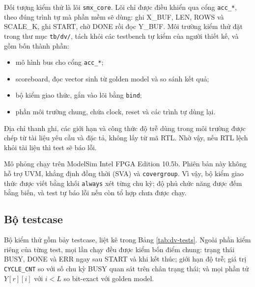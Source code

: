 Đối tượng kiểm thử là lõi \texttt{smx\_core}. Lõi chỉ được điều khiển qua cổng \texttt{acc\_*}, theo đúng trình tự mà phần mềm sẽ dùng: ghi X\_BUF, LEN, ROWS và SCALE\_K, ghi START, chờ DONE rồi đọc Y\_BUF. Môi trường kiểm thử đặt trong thư mục \texttt{tb/dv/}, tách khỏi các testbench tự kiểm của người thiết kế, và gồm bốn thành phần:
\begin{itemize}
  \item mô hình bus cho cổng \texttt{acc\_*};
  \item scoreboard, đọc vector sinh từ golden model và so sánh kết quả;
  \item bộ kiểm giao thức, gắn vào lõi bằng \texttt{bind};
  \item phần môi trường chung, chứa clock, reset và các trình tự dùng lại.
\end{itemize}
Địa chỉ thanh ghi, các giới hạn và công thức độ trễ dùng trong môi trường được chép từ tài liệu yêu cầu và đặc tả, không lấy từ mã RTL. Nhờ vậy, nếu RTL lệch khỏi tài liệu thì test sẽ báo lỗi.

Mô phỏng chạy trên ModelSim Intel FPGA Edition 10.5b. Phiên bản này không hỗ trợ UVM, khẳng định đồng thời (SVA) và \texttt{covergroup}. Vì vậy, bộ kiểm giao thức được viết bằng khối \texttt{always} xét từng chu kỳ; độ phủ chức năng được đếm bằng biến, và test tự báo lỗi nếu còn tổ hợp chưa được chạy.

\subsection{Bộ testcase}

Bộ kiểm thử gồm bảy testcase, liệt kê trong Bảng \ref{tab:dv-tests}. Ngoài phần kiểm riêng của từng test, mọi lần chạy đều được kiểm bốn điểm chung: trạng thái BUSY, DONE và ERR ngay sau START và khi kết thúc; giới hạn độ trễ; giá trị \texttt{CYCLE\_CNT} so với số chu kỳ BUSY quan sát trên chân trạng thái; và mọi phần tử $Y[r][i]$ với $i < L$ so bit-exact với golden model.

